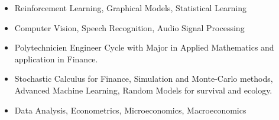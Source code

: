 \par

\begin{itemize}
\item Reinforcement Learning, Graphical Models, Statistical Learning
\item Computer Vision, Speech Recognition, Audio Signal Processing
\end{itemize}
\divider


\begin{itemize}
\item Polytechnicien Engineer Cycle with Major in Applied Mathematics and application in Finance.
\item Stochastic Calculus for Finance, Simulation and Monte-Carlo methods, Advanced Machine Learning, Random Models for survival and ecology.
\end{itemize}

\divider

\begin{itemize}
\item Data Analysis, Econometrics, Microeconomics, Macroeconomics
\end{itemize}

